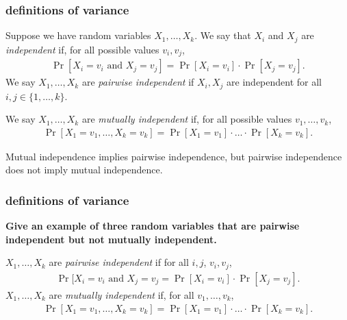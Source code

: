 \documentclass[handout,compress]{beamer}
\begin{document}
\begin{frame}
	\frametitle{definitions of variance}
	Suppose we have random variables $X_1, \ldots, X_k$. We say that $X_i$ and $X_j$ are \emph{independent} if, for all possible values $v_i, v_j$,
	\begin{align*}
			\Pr[X_i = v_i \text{ and } X_j = v_j] = 	\Pr[X_i = v_i]\cdot \Pr[X_j = v_j].
	\end{align*}
	We say $X_1, \ldots, X_k$ are \emph{pairwise independent} if $X_i,X_j$ are independent for all $i,j \in \{1, \ldots, k\}$.

\vspace{1em}
We say $X_1, \ldots, X_k$ are \emph{mutually independent} if, for all possible values $v_1, \ldots, v_k$,
		\begin{align*}
			\Pr[X_1 = v_1, \ldots, X_k = v_k] = 	\Pr[X_1 = v_1]\cdot\ldots \cdot\Pr[X_k = v_k].
		\end{align*}
	
	Mutual independence implies pairwise independence, but pairwise independence does not imply mutual independence. 
\end{frame}

\begin{frame}[t]
	\frametitle{definitions of variance}
		\begin{center}
		\textbf{\alert{Give an example of three random variables that are pairwise independent but not mutually independent.}}
	\end{center}
	 $X_1, \ldots, X_k$ are \emph{pairwise independent} if for all $i,j$, $v_i, v_j$, 
	 \begin{align*}
	 	\Pr[X_i = v_i \text{ and } X_j = v_j = 	\Pr[X_i = v_i]\cdot \Pr[X_j = v_j].
	 \end{align*}
 	$X_1, \ldots, X_k$ are \emph{mutually independent} if, for all $v_1, \ldots, v_k$,
	\begin{align*}
		\Pr[X_1 = v_1, \ldots, X_k = v_k] = 	\Pr[X_1 = v_1]\cdot\ldots \cdot\Pr[X_k = v_k].
	\end{align*}

\end{frame}
\end{document}
